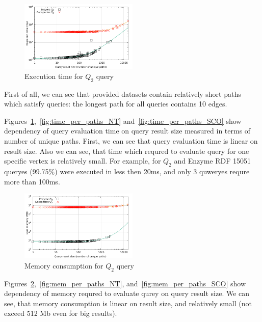 \begin{figure}[ht]
  \begin{center}
    \includegraphics[width=0.5\textwidth]{data/time_per_paths_BT.pdf}
    \caption{Execution time for $Q_2$ query}
    \label{fig:time_per_paths_BT}
  \end{center}
\end{figure}


First of all, we can see that provided datasets contain relatively short paths which satisfy queries: the longest path for all queries contains 10 edges. 

Figures~\ref{fig:time_per_paths_BT},~\ref{fig:time_per_paths_NT} and~\ref{fig:time_per_paths_SCO} show dependency of query evaluation time on query result size measured in terms of number of unique paths.
First, we can see that query evaluation time is linear on result size. 
Also we can see, that time which requred to evaluate query for one specific vertex is relatively small.
For example, for $Q_2$ and Enzyme RDF 15051 queryes (99.75\%) were executed in less then 20ms, and only 3 quweryes requre more than 100ms. 

\begin{figure}[ht]
  \begin{center}
    \includegraphics[width=0.5\textwidth]{data/mem_per_paths_BT.pdf}
    \caption{Memory consumption for $Q_2$ query}
    \label{fig:mem_per_paths_BT}
  \end{center}
\end{figure}

Figures~\ref{fig:mem_per_paths_BT},~\ref{fig:mem_per_paths_NT}, and~\ref{fig:mem_per_paths_SCO} show dependency of memory requred to evaluate qurey on query result size. We can see, that memory consumption is linear on result size, and relatively small (not exceed 512 Mb even for big results).

